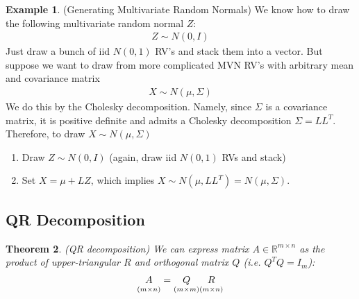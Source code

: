 \documentclass[12pt]{book}
\numberwithin{equation}{section} %
\theoremstyle{plain}
\newtheorem{thm}{Theorem}[section]
\theoremstyle{definition}
\newtheorem{ex}[thm]{Example}
\theoremstyle{remark}
\newcommand{\Rmn}{\mathbb{R}^{m\times n}}
\begin{document}
\begin{ex}(Generating Multivariate Random Normals)
We know how to draw the following multivariate random normal $Z$:
\begin{align*}
  Z \sim N(0,I)
\end{align*}
Just draw a bunch of iid $N(0,1)$ RV's and stack them into a vector.
But suppose we want to draw from more complicated MVN RV's with
arbitrary mean and covariance matrix
\begin{align*}
  X \sim N(\mu, \Sigma)
\end{align*}
We do this by the Cholesky decomposition. Namely, since $\Sigma$ is a
covariance matrix, it is positive definite and admits a Cholesky
decomposition $\Sigma=LL^T$. Therefore, to draw $X\sim N(\mu,\Sigma)$
\begin{enumerate}
  \item Draw $Z\sim N(0,I)$ (again, draw iid $N(0,1)$ RVs and stack)
  \item Set $X=\mu+LZ$, which implies $X\sim N(\mu,LL^T)=N(\mu,\Sigma)$.
\end{enumerate}
\end{ex}


\clearpage
\subsection{QR Decomposition}


\begin{thm}\emph{(QR decomposition)}
We can express matrix $A\in\Rmn$ as the product of upper-triangular $R$
and orthogonal matrix $Q$ (i.e. $Q^TQ=I_m$):
\begin{align*}
  \underset{(m\times n)}{A\vphantom{Q}}
  =
  \underset{(m\times m)}{Q}
  \underset{(m\times n)}{R\vphantom{Q}}
\end{align*}
\end{thm}
\end{document}
